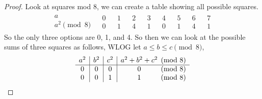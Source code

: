 \documentclass[11pt]{article}
\begin{document}
\begin{proof}
  Look at squares mod 8, we can create a table showing all possible squares.
  \[\begin{array}{c||c|c|c|c|c|c|c|c}
      \begin{matrix}
        a \\
        \hline
        a^2 \pmod{8}
      \end{matrix}
                     &
      \begin{matrix}
        0 \\
        \hline
        0
      \end{matrix} &
      \begin{matrix}
        1 \\
        \hline
        1
      \end{matrix} &
      \begin{matrix}
        2 \\
        \hline
        4
      \end{matrix} &
      \begin{matrix}
        3 \\
        \hline
        1
      \end{matrix} &
      \begin{matrix}
        4 \\
        \hline
        0
      \end{matrix} &
      \begin{matrix}
        5 \\
        \hline
        1
      \end{matrix} &
      \begin{matrix}
        6 \\
        \hline
        4
      \end{matrix} &
      \begin{matrix}
        7 \\
        \hline
        1
      \end{matrix}
    \end{array}\]
  So the only three options are 0, 1, and 4. So then we can look at the possible sums of three squares as follows, WLOG let $a\leq b\leq c\pmod{8}$,
  \[
    \begin{array}{c|c|c| c@{}c}
      a^2 & b^2 & c^2 & a^2 + b^2 + c^2 & \pmod{8} \\
      \hline
      0   & 0   & 0   & 0               & \pmod{8} \\
      0   & 0   & 1   & 1               & \pmod{8} \\

\end{array}\]
\end{proof}
\end{document}
